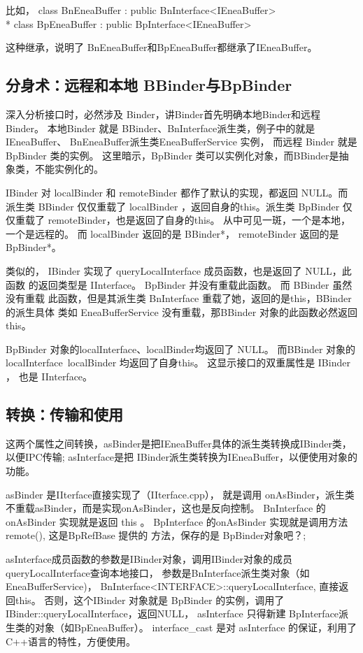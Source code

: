 \documentclass[a4paper,11pt]{article}
\begin{document}
比如，
class BnEneaBuffer : public BnInterface<IEneaBuffer> \\*
class BpEneaBuffer : public BpInterface<IEneaBuffer>

这种继承，说明了 BnEneaBuffer和BpEneaBuffer都继承了IEneaBuffer。

\subsection{分身术：远程和本地 BBinder与BpBinder}
深入分析接口时，必然涉及 Binder，讲Binder首先明确本地Binder和远程Binder。
本地Binder 就是 BBinder、BnInterface派生类，例子中的就是IEneaBuffer、
BnEneaBuffer派生类EneaBufferService 实例， 而远程 Binder 就是 BpBinder 类的实例。
这里暗示，BpBinder 类可以实例化对象，而BBinder是抽象类，不能实例化的。

IBinder 对 localBinder 和 remoteBinder 都作了默认的实现\cite{BinderCpp}，都返回 NULL。而
派生类 BBinder 仅仅重载了 localBinder ，返回自身的this。派生类 BpBinder 仅仅重载了
remoteBinder，也是返回了自身的this。 从中可见一斑，一个是本地，一个是远程的。
而 localBinder 返回的是 BBinder*，  remoteBinder 返回的是BpBinder*。

类似的， IBinder 实现了 queryLocalInterface 成员函数，也是返回了 NULL，此函数
的返回类型是 IInterface。 BpBinder 并没有重载此函数。 而 BBinder 虽然没有重载
此函数，但是其派生类 BnInterface 重载了她，返回的是this，BBinder的派生具体
类如 EneaBufferService 没有重载，那BBinder 对象的此函数必然返回this。

BpBinder 对象的localInterface、localBinder均返回了 NULL。
而BBinder 对象的localInterface\ localBinder 均返回了自身this。
这显示接口的双重属性是 IBinder ， 也是 IInterface。

\subsection{转换：传输和使用}

这两个属性之间转换，asBinder是把IEneaBuffer具体的派生类转换成IBinder类，以便IPC传输; asInterface是把
IBinder派生类转换为IEneaBuffer，以便使用对象的功能。

asBinder 是IIterface直接实现了（IIterface.cpp）， 就是调用 onAsBinder，派生类
不重载asBinder，而是实现onAsBinder，这也是反向控制。 BnInterface 的onAsBinder  实现就是返回 this 。
 BpInterface 的onAsBinder 实现就是调用方法 remote(), 这是BpRefBase 提供的
方法，保存的是 BpBinder对象吧？; 

asInterface\label{code:asInterface}成员函数的参数是IBinder对象，调用IBinder对象的成员queryLocalInterface查询本地接口，
参数是BnInterface派生类对象（如EneaBufferService)，
BnInterface<INTERFACE>::queryLocalInterface, 直接返回this。 否则，这个IBinder
对象就是 BpBinder 的实例，调用了 IBinder::queryLocalInterface，返回NULL，
asInterface 只得新建 BpInterface派生类的对象（如BpEneaBuffer）。
interface_cast 是对 asInterface 的保证，利用了C++语言的特性，方便使用。
\end{document}
